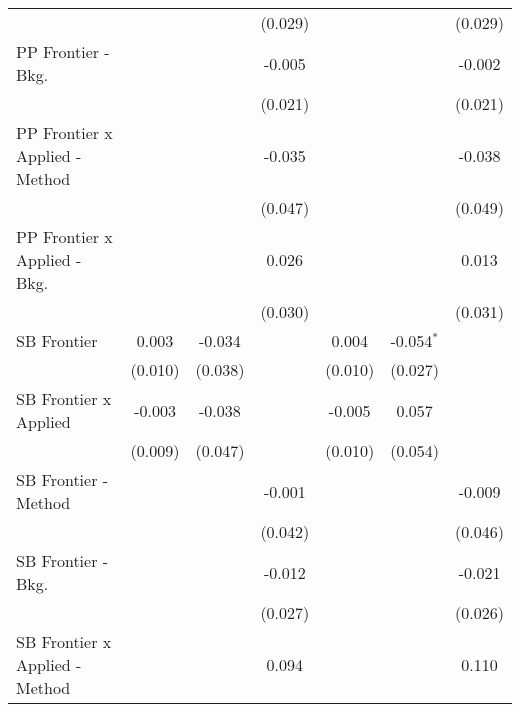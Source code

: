 \begin{tabular}{lcccccc}
                                  &                &                & (0.029)        &                &               & (0.029)\\   
   PP Frontier - Bkg.             &                &                & -0.005         &                &               & -0.002\\   
                                  &                &                & (0.021)        &                &               & (0.021)\\   
   PP Frontier x Applied - Method &                &                & -0.035         &                &               & -0.038\\   
                                  &                &                & (0.047)        &                &               & (0.049)\\   
   PP Frontier x Applied - Bkg.   &                &                & 0.026          &                &               & 0.013\\   
                                  &                &                & (0.030)        &                &               & (0.031)\\   
   SB Frontier                    & 0.003          & -0.034         &                & 0.004          & -0.054$^{*}$  &   \\   
                                  & (0.010)        & (0.038)        &                & (0.010)        & (0.027)       &   \\   
   SB Frontier x Applied          & -0.003         & -0.038         &                & -0.005         & 0.057         &   \\   
                                  & (0.009)        & (0.047)        &                & (0.010)        & (0.054)       &   \\   
   SB Frontier - Method           &                &                & -0.001         &                &               & -0.009\\   
                                  &                &                & (0.042)        &                &               & (0.046)\\   
   SB Frontier - Bkg.             &                &                & -0.012         &                &               & -0.021\\   
                                  &                &                & (0.027)        &                &               & (0.026)\\   
   SB Frontier x Applied - Method &                &                & 0.094          &                &               & 0.110\\   

\end{tabular}
